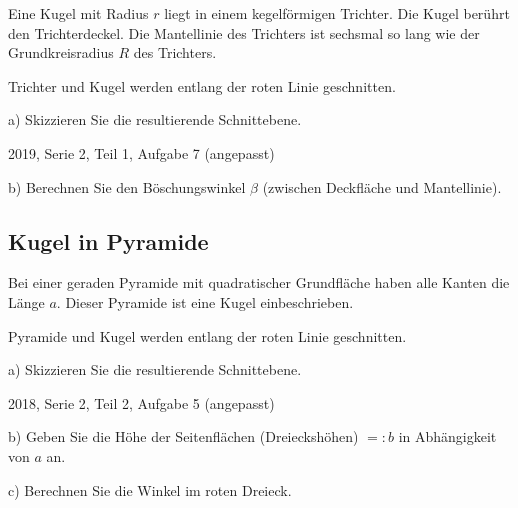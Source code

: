 Eine Kugel mit Radius $r$ liegt in einem kegelförmigen Trichter.
Die Kugel berührt den Trichterdeckel. Die Mantellinie des Trichters
ist sechsmal so lang wie der Grundkreisradius $R$ des Trichters.

Trichter und Kugel werden entlang der roten Linie geschnitten.

a) Skizzieren Sie die resultierende Schnittebene.

{\tiny{2019, Serie 2, Teil 1, Aufgabe 7 (angepasst)}}


b) Berechnen Sie den Böschungswinkel $\beta$ (zwischen Deckfläche und
Mantellinie).

\subsection{Kugel in Pyramide}
Bei einer geraden Pyramide mit quadratischer Grundfläche haben alle
Kanten die Länge $a$. Dieser Pyramide ist eine Kugel einbeschrieben.

Pyramide und Kugel werden entlang der roten Linie geschnitten.

a) Skizzieren Sie die resultierende Schnittebene.

{\tiny{2018, Serie 2, Teil 2, Aufgabe 5 (angepasst)}}


b) Geben Sie die Höhe der Seitenflächen (Dreieckshöhen) $=:b$ in
Abhängigkeit von $a$ an.

c) Berechnen Sie die Winkel im roten Dreieck.



